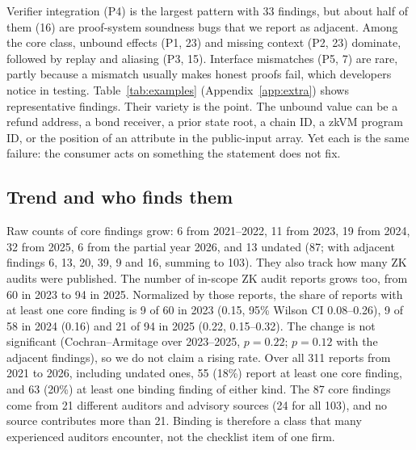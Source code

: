 Verifier integration (P4) is the largest pattern with 33 findings, but about
half of them (16) are proof-system soundness bugs that we report as adjacent.
Among the core class, unbound effects (P1, 23) and missing context (P2, 23)
dominate, followed by replay and aliasing (P3, 15). Interface mismatches (P5,
7) are rare, partly because a mismatch usually makes honest proofs fail, which
developers notice in testing.
Table~\ref{tab:examples} (Appendix~\ref{app:extra}) shows representative findings. Their variety is
the point. The unbound value can be a refund address, a bond receiver, a
prior state root, a chain ID, a zkVM program ID, or the position of an
attribute in the public-input array. Yet each is the same failure: the
consumer acts on something the statement does not fix.




\subsection{Trend and who finds them}\label{sec:study-trend}

Raw counts of core findings grow: 6 from 2021--2022, 11 from 2023, 19 from
2024, 32 from 2025, 6 from the partial year 2026, and 13 undated (87; with
adjacent findings 6, 13, 20, 39, 9 and 16, summing to 103). They also track
how many ZK audits were published.
The number of in-scope ZK audit reports grows too, from 60 in 2023 to 94 in
2025. Normalized by those reports, the share of reports with at least one
core finding is 9 of 60 in 2023 (0.15, 95\% Wilson CI 0.08--0.26), 9 of 58
in 2024 (0.16) and 21 of 94 in 2025 (0.22, 0.15--0.32). The change is not
significant (Cochran--Armitage over 2023--2025, $p=0.22$; $p=0.12$ with the
adjacent findings), so we do not claim a rising rate. Over all 311 reports
from 2021 to 2026, including undated ones, 55 (18\%) report at least one core
finding, and 63 (20\%) at least one binding finding of either kind.
The 87 core findings come from 21 different auditors and advisory sources
(24 for all 103), and no source contributes more than 21. Binding is therefore a class that many
experienced auditors encounter, not the checklist item of one firm.

